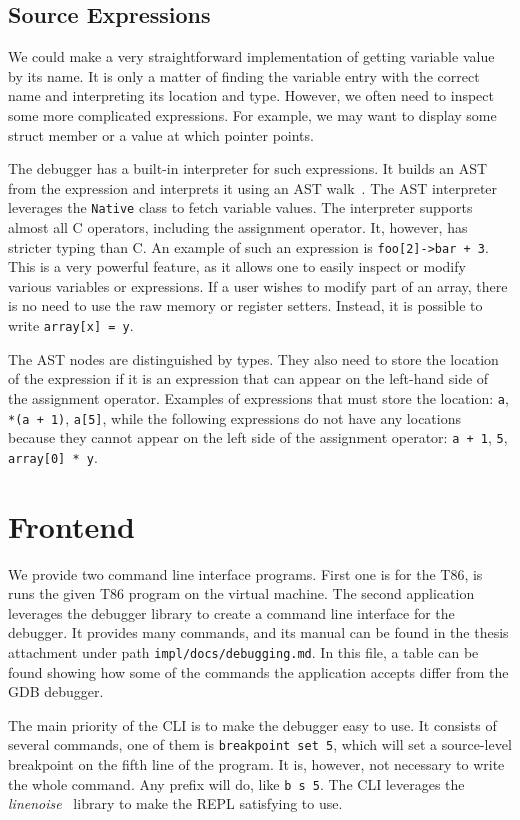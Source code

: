 \subsection{Source Expressions}
We could make a very straightforward implementation of getting variable value
by its name. It is only a matter of finding the variable entry with the correct
name and interpreting its location and type. However, we often need to inspect
some more complicated expressions. For example, we may want to display some
struct member or a value at which pointer points.

The debugger has a built-in interpreter for such expressions. It builds an AST
from the expression and interprets it using an
AST walk~\cite{crafting-interpreters}. The AST interpreter leverages the
\texttt{Native} class to fetch variable values. The interpreter supports almost
all C operators, including the assignment operator. It, however, has stricter
typing than C. An example of such an expression is \texttt{foo[2]->bar + 3}.
This is a very powerful feature, as it allows one to easily inspect or modify
various variables or expressions. If a user wishes to modify part of an array,
there is no need to use the raw memory or register setters. Instead, it is
possible to write \texttt{array[x] = y}.

The AST nodes are distinguished by types. They also need to store the location
of the expression  if it is an expression that can appear on the left-hand
side of the assignment operator. Examples of expressions that must store the
location: \texttt{a}, \texttt{*(a + 1)}, \texttt{a[5]}, while the following
expressions do not have any locations because they cannot appear on the left
side of the assignment operator: \texttt{a + 1}, \texttt{5}, \texttt{array[0]
* y}.

\section{Frontend}
We provide two command line interface programs. First one is for the T86, is
runs the given T86 program on the virtual machine. The second application
leverages the debugger library to create a command line interface for the
debugger. It provides many commands, and its manual can be found in the thesis
attachment under path \texttt{impl/docs/debugging.md}. In this file, a table
can be found showing how some of the commands the application accepts differ
from the GDB debugger.

The main priority of the CLI is to make the debugger easy to use. It consists
of several commands, one of them is \texttt{breakpoint set 5}, which will set a
source-level breakpoint on the fifth line of the program. It is, however, not
necessary to write the whole command. Any prefix will do, like \texttt{b s 5}.
The CLI leverages the \textit{linenoise}~\cite{linenoise} library to make the
REPL satisfying to use.


